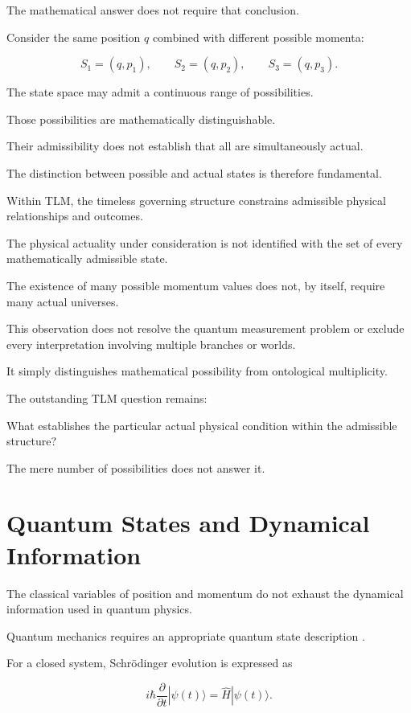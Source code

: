 \documentclass[12pt,onecolumn]{article}
\begin{document}
The mathematical answer does not require that conclusion.

Consider the same position $q$ combined with different possible momenta:

\begin{equation}
S_1=(q,p_1),\qquad
S_2=(q,p_2),\qquad
S_3=(q,p_3).
\end{equation}

The state space may admit a continuous range of possibilities.

Those possibilities are mathematically distinguishable.

Their admissibility does not establish that all are simultaneously actual.

The distinction between possible and actual states is therefore fundamental.

Within TLM, the timeless governing structure constrains admissible physical relationships and outcomes.

The physical actuality under consideration is not identified with the set of every mathematically admissible state.

The existence of many possible momentum values does not, by itself, require many actual universes.

This observation does not resolve the quantum measurement problem or exclude every interpretation involving multiple branches or worlds.

It simply distinguishes mathematical possibility from ontological multiplicity.

The outstanding TLM question remains:

What establishes the particular actual physical condition within the admissible structure?

The mere number of possibilities does not answer it.


\section{Quantum States and Dynamical Information}

The classical variables of position and momentum do not exhaust the dynamical information used in quantum physics.

Quantum mechanics requires an appropriate quantum state description \cite{Sakurai2017}.

For a closed system, Schr\"odinger evolution is expressed as

\begin{equation}
i\hbar\frac{\partial}{\partial t}|\psi(t)\rangle
=\hat H|\psi(t)\rangle.
\end{equation}
\end{document}
